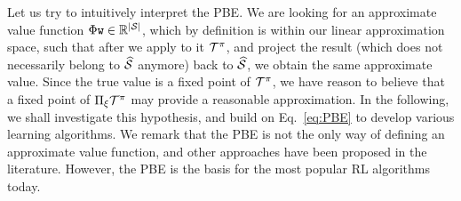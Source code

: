 Let us try to intuitively interpret the PBE. We are looking for an approximate value function $\Phi {\tt w} \in \mathbb{R}^{|\mathcal{S}|}$, which by definition is within our linear approximation space, such that after we apply to it $\mathcal{T}^\pi$, and project the result (which does not necessarily belong to $\widehat{\mathcal{S}}$ anymore) back to $\widehat{\mathcal{S}}$, we obtain the same approximate value. Since the true value is a fixed point of $\mathcal{T}^\pi$, we have reason to believe that a fixed point of $\Pi_{\xi}\mathcal{T}^\pi$ may provide a reasonable approximation. In the following, we shall investigate this hypothesis, and build on Eq.~\eqref{eq:PBE} to develop various learning algorithms. We remark that the PBE is not the only way of defining an approximate value function, and other approaches have been proposed in the literature. However, the PBE is the basis for the most popular RL algorithms today.




